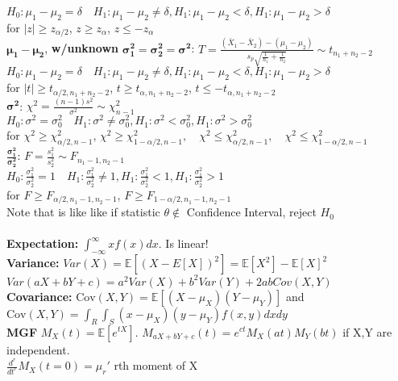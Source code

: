 \documentclass[answers,12pt,addpoints]{exam}
\begin{document}
$H_0: \mu_1 - \mu_2 = \delta \quad H_1: \mu_1 - \mu_2 \neq \delta, H_1: \mu_1 - \mu_2 < \delta, H_1: \mu_1 - \mu_2 > \delta$\\
for $|z| \geq z_{\alpha/2}$, $z \geq z_{\alpha}$, $z \leq -z_{\alpha}$\\
$\boldsymbol{\mu_1 - \mu_2}$, \textbf{w/unknown} $\boldsymbol{\sigma_1^2 = \sigma_2^2 = \sigma^2}$: $T = \frac{(\bar{X}_1 - \bar{X}_2) - (\mu_1 - \mu_2)}{s_p\sqrt{\frac{1}{n_1} + \frac{1}{n_2}}} \sim t_{n_1+n_2-2}$\\
$H_0: \mu_1 - \mu_2 = \delta \quad H_1: \mu_1 - \mu_2 \neq \delta, H_1: \mu_1 - \mu_2 < \delta, H_1: \mu_1 - \mu_2 > \delta$\\
for $|t| \geq t_{\alpha/2, n_1+n_2-2}$, $t \geq t_{\alpha, n_1+n_2-2}$, $t \leq -t_{\alpha, n_1+n_2-2}$\\
$\boldsymbol{\sigma^2}$: $\chi^2 = \frac{(n-1)s^2}{\sigma^2} \sim \chi_{n-1}^2$\\
$H_0: \sigma^2 = \sigma_0^2 \quad H_1: \sigma^2 \neq \sigma_0^2, H_1: \sigma^2 < \sigma_0^2, H_1: \sigma^2 > \sigma_0^2$\\
for $\chi^2 \geq \chi_{\alpha/2, n-1}^2$, $\chi^2 \geq \chi_{1-\alpha/2, n-1}^2, \quad \chi^2 \leq \chi_{\alpha/2, n-1}^2, \quad \chi^2 \leq \chi_{1-\alpha/2, n-1}^2$\\
$\boldsymbol{\frac{\sigma_1^2}{\sigma_2^2}}$: $F = \frac{s_1^2}{s_2^2} \sim F_{n_1-1, n_2-1}$\\
$H_0: \frac{\sigma_1^2}{\sigma_2^2} = 1 \quad H_1: \frac{\sigma_1^2}{\sigma_2^2} \neq 1, H_1: \frac{\sigma_1^2}{\sigma_2^2} < 1, H_1: \frac{\sigma_1^2}{\sigma_2^2} > 1$\\
for $F \geq F_{\alpha/2, n_1-1, n_2-1}$, $F \geq F_{1-\alpha/2, n_1-1, n_2-1}$\\
Note that is like like if statistic $\theta \notin $ Confidence Interval, reject $H_0$\\\\
\textbf{Expectation:} $\int_{-\infty}^\infty xf(x)dx$. Is linear!\\
\textbf{Variance:} $Var(X) = \mathbb{E}[(X-E[X])^2] = \mathbb{E}[X^2] - \mathbb{E}[X]^2$\\
$Var(aX+bY+c) = a^2Var(X) + b^2Var(Y) + 2abCov(X,Y)$\\
\textbf{Covariance:} $\text{Cov}(X,Y) = \mathbb{E}[(X-\mu_X)(Y-\mu_Y)]$ and $\text{Cov}(X,Y) = \int_R \int_S (x-\mu_X)(y-\mu_Y)f(x,y)dxdy$\\
\textbf{MGF} $M_X(t) = \mathbb{E}[e^{tX}]$. $M_{aX+bY+c}(t) = e^{ct}M_X(at)M_Y(bt)$ if X,Y are independent. \\
$\frac{d^r}{dt^r} M_X(t = 0) = \mu_r' $ rth moment of X
\end{document}
